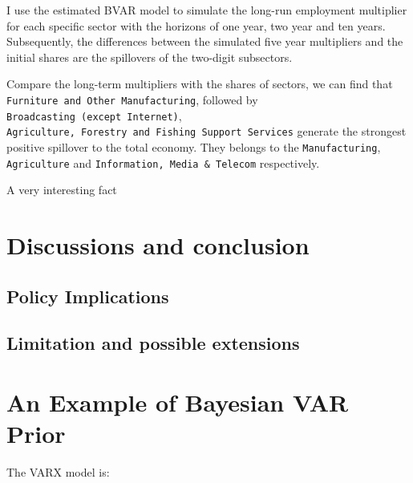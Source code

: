 \documentclass{monashthesis}
\begin{document}
I use the estimated BVAR model to simulate the long-run employment multiplier for each specific sector with the horizons of one year, two year and ten years. Subsequently, the differences between the simulated five year multipliers and the initial shares are the spillovers of the two-digit subsectors.

Compare the long-term multipliers with the shares of sectors, we can find that \texttt{Furniture\ and\ Other\ Manufacturing}, followed by \texttt{Broadcasting\ (except\ Internet)}, \texttt{Agriculture,\ Forestry\ and\ Fishing\ Support\ Services} generate the strongest positive spillover to the total economy. They belongs to the \texttt{Manufacturing}, \texttt{Agriculture} and \texttt{Information,\ Media\ \&\ Telecom} respectively.

A very interesting fact

\hypertarget{discussions-and-conclusion}{%
\chapter{Discussions and conclusion}\label{discussions-and-conclusion}}

\hypertarget{policy-implications}{%
\section{Policy Implications}\label{policy-implications}}

\hypertarget{limitation-and-possible-extensions}{%
\section{Limitation and possible extensions}\label{limitation-and-possible-extensions}}

\appendix

\hypertarget{an-example-of-bayesian-var-prior}{%
\chapter{An Example of Bayesian VAR Prior}\label{an-example-of-bayesian-var-prior}}

The VARX model is:
\end{document}
